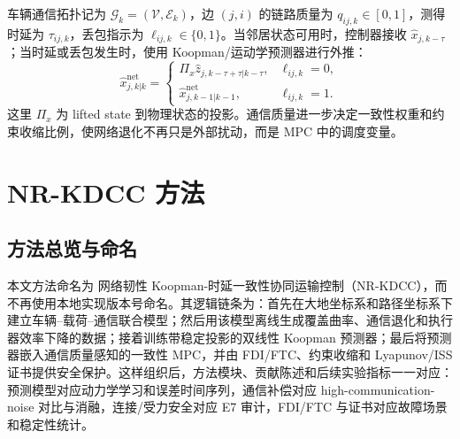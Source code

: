 \documentclass[twocolumn,3p,times,procedia]{elsarticle}
\newcommand{\Method}{NR-KDCC}
\newcommand{\MethodCN}{网络韧性 Koopman-时延一致性协同运输控制}
\begin{document}
车辆通信拓扑记为 $\mathcal G_k=(\mathcal V,\mathcal E_k)$，边 $(j,i)$ 的链路质量为 $q_{ij,k}\in[0,1]$，测得时延为 $\tau_{ij,k}$，丢包指示为 $\ell_{ij,k}\in\{0,1\}$。当邻居状态可用时，控制器接收 $\hat x_{j,k-\tau}$；当时延或丢包发生时，使用 Koopman/运动学预测器进行外推：
\begin{equation}
\hat x_{j,k|k}^{\mathrm{net}}=
\begin{cases}
\Pi_x \hat z_{j,k-\tau+\tau|k-\tau}, & \ell_{ij,k}=0,\\
\hat x_{j,k-1|k-1}^{\mathrm{net}}, & \ell_{ij,k}=1 .
\end{cases}
\label{eq:delay_prediction}
\end{equation}
这里 $\Pi_x$ 为 lifted state 到物理状态的投影。通信质量进一步决定一致性权重和约束收缩比例，使网络退化不再只是外部扰动，而是 MPC 中的调度变量。

\section{\Method{} 方法}

\subsection{方法总览与命名}

本文方法命名为 \MethodCN{}（\Method{}），而不再使用本地实现版本号命名。其逻辑链条为：首先在大地坐标系和路径坐标系下建立车辆--载荷--通信联合模型；然后用该模型离线生成覆盖曲率、通信退化和执行器效率下降的数据；接着训练带稳定投影的双线性 Koopman 预测器；最后将预测器嵌入通信质量感知的一致性 MPC，并由 FDI/FTC、约束收缩和 Lyapunov/ISS 证书提供安全保护。这样组织后，方法模块、贡献陈述和后续实验指标一一对应：预测模型对应动力学学习和误差时间序列，通信补偿对应 high-communication-noise 对比与消融，连接/受力安全对应 E7 审计，FDI/FTC 与证书对应故障场景和稳定性统计。
\end{document}
